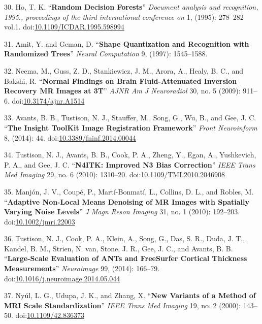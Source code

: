 \documentclass[11pt,]{article}
\begin{document}
\hypertarget{ref-ho1995}{}
30. Ho, T. K. ``\textbf{Random Decision Forests}'' \emph{Document
analysis and recognition, 1995., proceedings of the third international
conference on} 1, (1995): 278--282 vol.1.
doi:\href{https://doi.org/10.1109/ICDAR.1995.598994}{10.1109/ICDAR.1995.598994}

\hypertarget{ref-amit1997}{}
31. Amit, Y. and Geman, D. ``\textbf{Shape Quantization and Recognition
with Randomized Trees}'' \emph{Neural Computation} 9, (1997):
1545--1588.

\hypertarget{ref-Neema:2009aa}{}
32. Neema, M., Guss, Z. D., Stankiewicz, J. M., Arora, A., Healy, B. C.,
and Bakshi, R. ``\textbf{Normal Findings on Brain Fluid-Attenuated
Inversion Recovery MR Images at 3T}'' \emph{AJNR Am J Neuroradiol} 30,
no. 5 (2009): 911--6.
doi:\href{https://doi.org/10.3174/ajnr.A1514}{10.3174/ajnr.A1514}

\hypertarget{ref-Avants:2014aa}{}
33. Avants, B. B., Tustison, N. J., Stauffer, M., Song, G., Wu, B., and
Gee, J. C. ``\textbf{The Insight ToolKit Image Registration Framework}''
\emph{Front Neuroinform} 8, (2014): 44.
doi:\href{https://doi.org/10.3389/fninf.2014.00044}{10.3389/fninf.2014.00044}

\hypertarget{ref-Tustison:2010ac}{}
34. Tustison, N. J., Avants, B. B., Cook, P. A., Zheng, Y., Egan, A.,
Yushkevich, P. A., and Gee, J. C. ``\textbf{N4ITK: Improved N3 Bias
Correction}'' \emph{IEEE Trans Med Imaging} 29, no. 6 (2010): 1310--20.
doi:\href{https://doi.org/10.1109/TMI.2010.2046908}{10.1109/TMI.2010.2046908}

\hypertarget{ref-Manjon:2010aa}{}
35. Manjón, J. V., Coupé, P., Martí-Bonmatí, L., Collins, D. L., and
Robles, M. ``\textbf{Adaptive Non-Local Means Denoising of MR Images
with Spatially Varying Noise Levels}'' \emph{J Magn Reson Imaging} 31,
no. 1 (2010): 192--203.
doi:\href{https://doi.org/10.1002/jmri.22003}{10.1002/jmri.22003}

\hypertarget{ref-Tustison:2014ab}{}
36. Tustison, N. J., Cook, P. A., Klein, A., Song, G., Das, S. R., Duda,
J. T., Kandel, B. M., Strien, N. van, Stone, J. R., Gee, J. C., and
Avants, B. B. ``\textbf{Large-Scale Evaluation of ANTs and FreeSurfer
Cortical Thickness Measurements}'' \emph{Neuroimage} 99, (2014):
166--79.
doi:\href{https://doi.org/10.1016/j.neuroimage.2014.05.044}{10.1016/j.neuroimage.2014.05.044}

\hypertarget{ref-nyul2000}{}
37. Nyúl, L. G., Udupa, J. K., and Zhang, X. ``\textbf{New Variants of a
Method of MRI Scale Standardization}'' \emph{IEEE Trans Med Imaging} 19,
no. 2 (2000): 143--50.
doi:\href{https://doi.org/10.1109/42.836373}{10.1109/42.836373}
\end{document}

